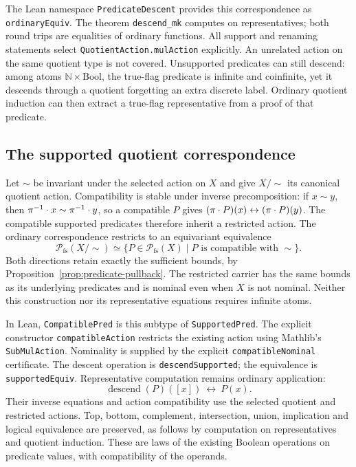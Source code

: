 The Lean namespace \texttt{PredicateDescent} provides this correspondence
as \texttt{ordinaryEquiv}. The theorem \texttt{descend\_mk} computes on
representatives; both round trips are equalities of ordinary functions.
All support and renaming
statements select \texttt{QuotientAction.mulAction} explicitly. An unrelated
action on the same quotient type is not covered. Unsupported predicates can
still descend: among atoms $\mathbb N\times\mathrm{Bool}$, the true-flag
predicate is infinite and coinfinite, yet it descends through a quotient
forgetting an extra discrete label. Ordinary quotient induction can then
extract a true-flag representative from a proof of that predicate.

\subsection{The supported quotient correspondence}

Let $\sim$ be invariant under the selected action on $X$ and give
$X/{\sim}$ its canonical quotient action. Compatibility is stable under
inverse precomposition: if $x\sim y$, then
$\pi^{-1}\mathbin{\cdot} x\sim\pi^{-1}\mathbin{\cdot} y$, so a compatible $P$ gives
$(\pi\mathbin{\cdot} P)(x)\leftrightarrow(\pi\mathbin{\cdot} P)(y)$.
The compatible supported predicates therefore inherit a restricted action.
The ordinary correspondence restricts to an equivariant equivalence
\[
 \mathcal P_{\mathrm{fs}}(X/{\sim})
 \simeq
 \{P\in\mathcal P_{\mathrm{fs}}(X)\mid P\text{ is compatible with }\sim\}.
\]
Both directions retain exactly the sufficient bounds, by
Proposition~\ref{prop:predicate-pullback}. The restricted carrier has the
same bounds as its underlying predicates and is nominal even when $X$ is
not nominal. Neither this construction nor its representative equations
requires infinite atoms.

In Lean, \texttt{CompatiblePred} is this subtype of \texttt{SupportedPred}.
The explicit constructor \texttt{compatibleAction} restricts the existing
action using Mathlib's \texttt{SubMulAction}. Nominality is supplied by the
explicit \texttt{compatibleNominal} certificate.
The descent operation is \texttt{descendSupported}; the equivalence is
\texttt{supportedEquiv}. Representative computation remains ordinary application:
\[
 \operatorname{descend}(P)([x])\ \longleftrightarrow\ P(x).
\]
Their inverse equations and action compatibility use the selected quotient
and restricted actions. Top, bottom, complement, intersection, union,
implication and logical equivalence are preserved, as follows by computation
on representatives and quotient induction. These are laws of the existing
Boolean operations on predicate values, with compatibility of the operands.

